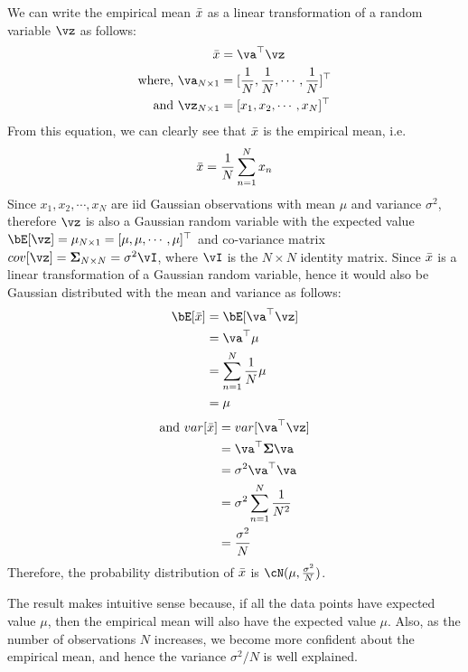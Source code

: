 \documentclass[a4paper,11pt]{article}
\begin{document}
\begin{pmisolution}

We can write the empirical mean $\Bar{x}$  as a linear transformation of a random variable $\vz$ as follows:
\begin{equation*}
\begin{split}
    \Bar{x} &= \va^\top\vz \\
    \text{where, } \va_{N\times1} &= [ \frac{1}{N}, \frac{1}{N}, \cdots, \frac{1}{N} ]^\top \\
    \text{and } \vz_{N\times1} &= [ x_1, x_2, \cdots, x_N ]^\top \\
\end{split}
\end{equation*}
From this equation, we can clearly see that $\Bar{x}$ is the empirical mean, i.e.
\begin{equation*}
\Bar{x} = \frac{1}{N} \sum_{n=1}^{N} x_n
\end{equation*}
Since $x_1, x_2, \cdots, x_N$ are iid Gaussian observations with mean $\mu$ and variance $\sigma^2$, therefore $\vz$ is also a Gaussian random variable with the expected value  $ \bE[\vz] = \mathbf{\mu}_{N\times1} = [ \mu, \mu, \cdots, \mu ]^\top $ and co-variance matrix $cov[\vz] = \mathbf{\Sigma}_{N\times N} = \sigma^2\vI$, where $\vI$ is the $N\times N$ identity matrix. Since $\Bar{x}$ is a linear transformation of a Gaussian random variable, hence it would also be Gaussian distributed with the mean and variance as follows:
\begin{equation*}
    \begin{split}
    \bE[\Bar{x}] &= \bE[\va^\top\vz] \\
    &= \va^\top \mathbf{\mu} \\
    &= \sum_{n=1}^{N} \frac{1}{N}\mu \\
    & = \mu
    \end{split}
\end{equation*}
\begin{equation*}
    \begin{split}
    \text{and } var[\Bar{x}] &= var[\va^\top\vz] \\
    &= \va^\top\mathbf{\Sigma}\va \\
    &= \sigma^2\va^\top\va \\
    &= \sigma^2\sum_{n=1}^{N} \frac{1}{N^2} \\
    &= \frac{\sigma^2}{N}
    \end{split}
\end{equation*}
Therefore, the probability distribution of $\Bar{x}$ is $\cN(\mu, \frac{\sigma^2}{N})$.

The result makes intuitive sense because, if all the data points have
expected value $\mu$, then the empirical mean will also have the expected value $\mu$. Also, as
the number of observations $N$ increases, we become more confident about the empirical mean, and hence the variance $\sigma^2/N$ is well explained.
\end{pmisolution}
\end{document}
